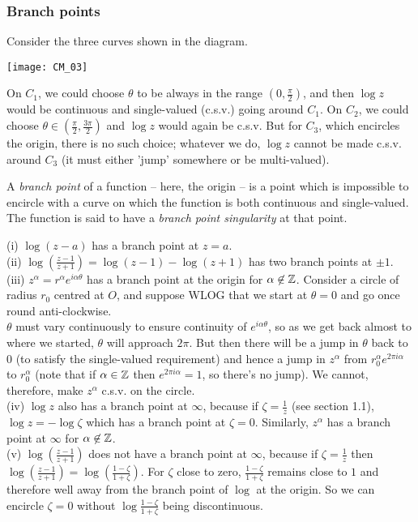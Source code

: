 \documentclass[a4paper]{article}
\begin{document}
\subsubsection{Branch points}
Consider the three curves shown in the diagram.

\texttt{[image: CM\_03]}

On $C_1$, we could choose $\theta$ to be always in the range $(0,\frac{\pi}{2})$, and then $\log z$ would be continuous and single-valued (c.s.v.) going around $C_1$. On $C_2$, we could choose $\theta \in (\frac{\pi}{2},\frac{3\pi}{2})$ and $\log z$ would again be c.s.v. But for $C_3$, which encircles the origin, there is no such choice; whatever we do, $\log z$ cannot be made c.s.v. around $C_3$ (it must either 'jump' somewhere or be multi-valued).

A \emph{branch point} of a function -- here, the origin -- is a point which is impossible to encircle with a curve on which the function is both continuous and single-valued. The function is said to have a \emph{branch point singularity} at that point.

\begin{eg}
(i) $\log(z-a)$ has a branch point at $z=a$.\\
(ii) $\log (\frac{z-1}{z+1}) = \log(z-1) - \log(z+1)$ has two branch points at $\pm 1$.\\
(iii) $z^\alpha = r^\alpha e^{i\alpha \theta}$ has a branch point at the origin for $\alpha \not\in \mathbb{Z}$. Consider a circle of radius $r_0$ centred at $O$, and suppose WLOG that we start at $\theta = 0$ and go once round anti-clockwise.\\
$\theta$ must vary continuously to ensure continuity of $e^{i\alpha\theta}$, so as we get back almost to where we started, $\theta$ will approach $2\pi$. But then there will be a jump in $\theta$ back to $0$ (to satisfy the single-valued requirement) and hence a jump in $z^\alpha$ from $r_0^\alpha e^{2\pi i\alpha}$ to $r_0^\alpha$ (note that if $\alpha \in \mathbb{Z}$ then $e^{2\pi i\alpha} = 1$, so there's no jump). We cannot, therefore, make $z^\alpha$ c.s.v. on the circle.\\
(iv) $\log z$ also has a branch point at $\infty$, because if $\zeta = \frac{1}{z}$ (see section 1.1), $\log z = -\log \zeta$ which has a branch point at $\zeta = 0$. Similarly, $z^\alpha$ has a branch point at $\infty$ for $\alpha \not \in \mathbb{Z}$.\\
(v) $\log(\frac{z-1}{z+1})$ does not have a branch point at $\infty$, because if $\zeta = \frac{1}{z}$ then $\log(\frac{z-1}{z+1}) = \log(\frac{1-\zeta}{1+\zeta})$. For $\zeta$ close to zero, $\frac{1-\zeta}{1+\zeta}$ remains close to $1$ and therefore well away from the branch point of $\log$ at the origin. So we can encircle $\zeta = 0$ without $\log \frac{1-\zeta}{1+\zeta}$ being discontinuous.
\end{eg}
\end{document}

